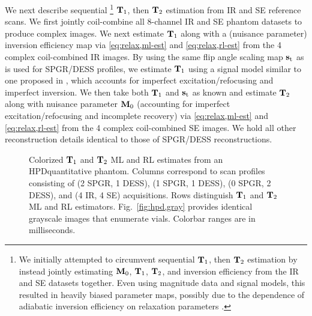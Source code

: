 We next describe sequential
\footnote{
We initially attempted 
to circumvent sequential $\mathbf{T}_1$, then $\mathbf{T}_2$ estimation 
by instead jointly estimating $\mathbf{M}_0$, $\mathbf{T}_1$, $\mathbf{T}_2$, and inversion efficiency 
from the IR and SE datasets together.
Even using magnitude data and signal models, 
this resulted in heavily biased parameter maps, 
possibly due to the dependence 
of adiabatic inversion efficiency 
on relaxation parameters \cite{frank:97:spe}.
}
$\mathbf{T}_1$,
then $\mathbf{T}_2$ estimation
from IR and SE reference scans.
We first jointly coil-combine
all 8-channel IR and SE phantom datasets 
to produce complex images.
We next estimate $\mathbf{T}_1$ along 
with a (nuisance parameter) inversion efficiency map
via \eqref{eq:relax,ml-est} and \eqref{eq:relax,rl-est} 
from the 4 complex coil-combined IR images.
By using the same flip angle scaling map $\mathbf{s}_\mathrm{t}$ 
as is used for SPGR/DESS profiles, 
we estimate $\mathbf{T}_1$ using a signal model similar
to one proposed in \cite{barral:10:arm},
which accounts for imperfect excitation/refocusing 
and imperfect inversion.
We then take both $\mathbf{T}_1$ and $\mathbf{s}_\mathrm{t}$ 
as known and estimate $\mathbf{T}_2$ 
along with nuisance parameter $\mathbf{M}_0$ 
(accounting for imperfect excitation/refocusing and incomplete recovery) 
via \eqref{eq:relax,ml-est} and \eqref{eq:relax,rl-est} 
from the 4 complex coil-combined SE images.
We hold all other reconstruction details identical 
to those of SPGR/DESS reconstructions.

\begin{figure*} [!tb]
	\centering
	\vspace{0cm}
	\caption{
		Colorized $\mathbf{T}_1$ and $\mathbf{T}_2$ ML and RL estimates 
		from an HPD\regis quantitative phantom.
		Columns correspond to scan profiles consisting of 
		(2 SPGR, 1 DESS), (1 SPGR, 1 DESS), (0 SPGR, 2 DESS),
		and (4 IR, 4 SE) acquisitions. 
		Rows distinguish $\mathbf{T}_1$ and $\mathbf{T}_2$ ML and RL estimators. 
		Fig.~\ref{fig:hpd,gray} provides identical grayscale images
		that enumerate vials.
		Colorbar ranges are in milliseconds.
	}
	\label{fig:hpd,jet}
\end{figure*}

